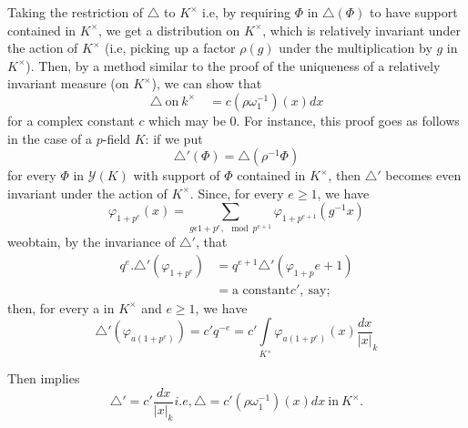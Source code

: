  Taking the restriction of $\triangle$ to $K^{\times}$ i.e, by requiring
 $\Phi$ in $\triangle(\Phi)$ to have support contained in $K^{\times}$,
 we get a distribution on $K^{\times}$, which is relatively invariant
 under the action of $K^{\times}$ (i.e, picking up a factor $\rho(g)$
 under the multiplication by $g$ in $K^{\times}$). Then, by a method
 similar to the proof of  the uniqueness of a relatively invariant
 measure (on $K^{\times}$), we can show that 
\begin{equation*}
  \triangle~\text{on}~ k^{\times}\quad = c(\rho\omega_{1}^{-1}) (x)dx
  \tag{61}\label{chap2:sec1:subsec4:eq61}
\end{equation*}
for a complex constant $c$ which may be $0$. For instance, this proof
goes as follows in the case of a $p$-field $K$: if we put 
\begin{equation*}
\triangle'(\Phi)=\triangle(\rho^{-1}\Phi)
\end{equation*}
 for every $\Phi$ in $\mathscr{Y}(K)$ with support of $\Phi$ contained
 in $K^{\times}$, then $\triangle'$ becomes even invariant under the
 action of $K^{\times}$. Since, for every $e\ge 1$, we have 
\begin{equation*}
  \varphi_{1+p^{e}}(x)=\sum\limits_{g\epsilon 1+p^{e},\mod
  p^{e+1}}\varphi_{1+p^{e+1}}(g^{-1}x) 
\end{equation*}
 we\pageoriginale obtain, by the invariance of $\triangle'$, that
\begin{align*}
  q^{e}.\triangle'(\varphi_{1+p^{e}})
  & = q^{e+1}\triangle'(\varphi_{1+p}e+1)\\
  & = \text{a constant} c', ~\text{say};
\end{align*}
then, for every a in $K^{\times}$ and $e\ge 1$, we have
\begin{equation*}
  \triangle'(\varphi_{a(1+p^{e})})=c'q^{-e}=c'
  \int\limits_{K^{\times}}\varphi_{a(1+p^{e})}(x)\frac{dx}{|x|}_{k}
\end{equation*}

Then implies
\begin{equation*}
  \triangle'=c'\frac{dx}{|x|_{k}} i.e,
  \triangle=c'(\rho\omega_{1}^{-1})(x)dx ~\text{in}~ K^{\times}.
\end{equation*}

